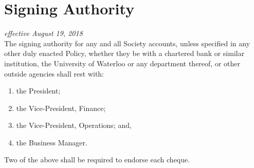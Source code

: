 \section{Signing Authority}
\emph{effective August 19, 2018}\\

The signing authority for any and all Society accounts, unless specified in any
other duly enacted Policy, whether they be with a chartered bank or similar
institution, the University of Waterloo or any department thereof, or other
outside agencies shall rest with:

\begin{enumerate}
    \item the President;
    \item the Vice-President, Finance;
    \item the Vice-President, Operations; and,
    \item the Business Manager.
\end{enumerate}

Two of the above shall be required to endorse each cheque.
